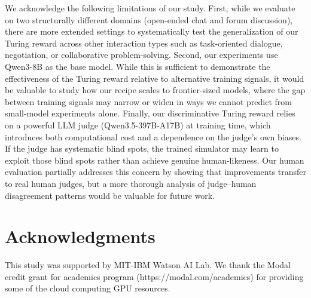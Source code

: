 \documentclass{article} %
\begin{document}
We acknowledge the following limitations of our study. First, while we evaluate on two structurally different domains (open-ended chat and forum discussion), there are more extended settings to systematically test the generalization of our Turing reward across other interaction types such as task-oriented dialogue, negotiation, or collaborative problem-solving. Second, our experiments use Qwen3-8B as the base model. While this is sufficient to demonstrate the effectiveness of the Turing reward relative to alternative training signals, it would be valuable to study how our recipe scales to frontier-sized models, where the gap between training signals may narrow or widen in ways we cannot predict from small-model experiments alone. Finally, our discriminative Turing reward relies on a powerful LLM judge (Qwen3.5-397B-A17B) at training time, which introduces both computational cost and a dependence on the judge's own biases. If the judge has systematic blind spots, the trained simulator may learn to exploit those blind spots rather than achieve genuine human-likeness. Our human evaluation partially addresses this concern by showing that improvements transfer to real human judges, but a more thorough analysis of judge–human disagreement patterns would be valuable for future work.


\section*{Acknowledgments}
This study was supported by MIT-IBM Watson AI Lab. We thank the Modal credit grant for academics program (https://modal.com/academics) for providing some of the cloud computing GPU resources.


\end{document}
